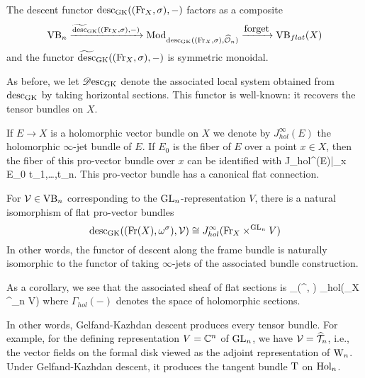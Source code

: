 \begin{lemma}
The descent functor ${\rm desc}_{\rm GK}(({\rm Fr}_X,\sigma),-)$ factors as a composite
\[
\VB_n \xto{\widetilde{\desc}_\GK((\Fr_X,\sigma),-)} \Mod_{\desc_\GK((\Fr_X,\sigma),\hO_n)} \xto{\txt{forget}} \VB_{flat}(X)
\]
and the functor $\widetilde{{\rm desc}}_{\rm GK}(({\rm Fr}_X,\sigma),-)$ is symmetric monoidal.
\end{lemma}

As before, we let $\mathscr{D}{\rm esc}_{{\rm GK}}$ denote the associated local system
obtained from ${\rm desc}_{{\rm GK}}$ by taking horizontal sections. This
functor is well-known: it recovers the tensor bundles on $X$.

If $E \to X$ is a holomorphic vector bundle on $X$ we denote by
$J_{hol}^\infty(E)$ the holomorphic $\infty$-jet bundle of $E$. If
$E_0$ is the fiber of $E$ over a point $x \in X$, then the fiber of
this pro-vector bundle over $x$ can be identified with
\ben
J_{hol}^\infty (E)|_{x} \cong E_0 \times \CC \ll t_1,\ldots,t_n\rr .
\een
This pro-vector bundle has a canonical flat connection.

\begin{prop}
For $\mathcal{V} \in {\rm VB}_n$ corresponding to the ${\rm GL}_n$-representation $V$,
there is a natural isomorphism of flat pro-vector bundles
\[
{\rm desc}_{\rm GK}(({\rm Fr}(X),\omega^\sigma),\mathcal{V}) \cong J_{hol}^\infty({\rm Fr}_X
\times^{{\rm GL}_n} V)
\]
In other words, the functor of descent along the frame bundle is
naturally isomorphic to the functor of taking $\infty$-jets of the associated bundle construction.
\end{prop} 

As a corollary, we see that the associated sheaf of flat sections is
\ben
\sdesc_{\GK}(\omega^\sigma, \cV) \cong \Gamma_{hol}(\Fr_X
\times^{\GL_n} V)
\een
where $\Gamma_{hol}(-)$ denotes the space of holomorphic sections. 

In other words, Gelfand-Kazhdan descent produces every tensor bundle. 
For example, for the defining representation $V = \mathbb C^n$ of ${\rm GL}_n$, we have $\mathcal{V} =\widehat{\mathcal T}_n$, 
i.e., the vector fields on the formal disk viewed as the adjoint representation of  ${{\rm W}_n}$. 
Under Gelfand-Kazhdan descent, it produces the tangent bundle ${\rm T}$ on ${\rm Hol}_n$.


